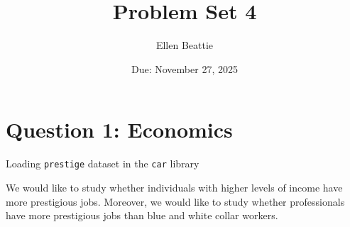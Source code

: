 \documentclass[12pt,letterpaper]{article}
\title{Problem Set 4}
\date{Due: November 27, 2025}
\author{Ellen Beattie}
\begin{document}
	\maketitle



\section*{Question 1: Economics}
\vspace{.25cm}
\noindent 	
Loading \texttt{prestige} dataset in the \texttt{car} library

\vspace{.25cm}

\noindent We would like to study whether individuals with higher levels of income have more prestigious jobs. Moreover, we would like to study whether professionals have more prestigious jobs than blue and white collar workers.
\end{document}
